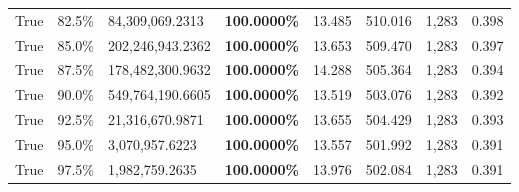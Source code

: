 \begin{table}[H]
\begin{tabular}{lllrllll}
\cline{1-8}
True & 82.5\% & 84,309,069.2313 & \bfseries \color{red} 100.0000\% & 13.485 & 510.016 & 1,283 & 0.398 \\
\cline{1-8}
True & 85.0\% & 202,246,943.2362 & \bfseries \color{red} 100.0000\% & 13.653 & 509.470 & 1,283 & 0.397 \\
\cline{1-8}
True & 87.5\% & 178,482,300.9632 & \bfseries \color{red} 100.0000\% & 14.288 & 505.364 & 1,283 & 0.394 \\
\cline{1-8}
True & 90.0\% & 549,764,190.6605 & \bfseries \color{red} 100.0000\% & 13.519 & 503.076 & 1,283 & 0.392 \\
\cline{1-8}
True & 92.5\% & 21,316,670.9871 & \bfseries \color{red} 100.0000\% & 13.655 & 504.429 & 1,283 & 0.393 \\
\cline{1-8}
True & 95.0\% & 3,070,957.6223 & \bfseries \color{red} 100.0000\% & 13.557 & 501.992 & 1,283 & 0.391 \\
\cline{1-8}
True & 97.5\% & 1,982,759.2635 & \bfseries \color{red} 100.0000\% & 13.976 & 502.084 & 1,283 & 0.391 \\
\cline{1-8}
\bottomrule
\end{tabular}
\end{table}
